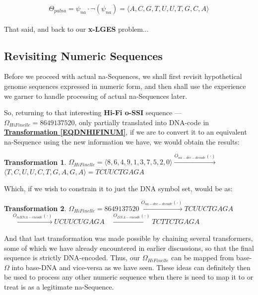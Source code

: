 \documentclass[a4paper, 18pt]{book} %
\newtheorem{trans}{Transformation}
\begin{document}
\begin{equation}
\label{EQPALNASEQ}
\Theta_{palna} = \psi_{na} \cdot \lnot(\psi_{na}) =  \langle A , C , G , T , U , U , T , G , C , A \rangle
\end{equation}\\


That said, and back to our \textbf{x-LGES} problem...

\subsection{Revisiting Numeric Sequences}

Before we proceed with actual na-Sequences, we shall first revisit hypothetical genome sequences expressed in numeric form, and then shall use the experience we garner to handle processing of actual na-Sequences later.

So, returning to that interesting \textbf{Hi-Fi o-SSI} sequence --- $\Omega_{HiFinelle} = 8649137520$, only partially translated into DNA-code in  \textbf{\hyperref[EQDNHIFINUM]{Transformation \ref{EQDNHIFINUM}}}, if we are to convert it to an equivalent na-Sequence using the new information we have, we would obtain the results:

\begin{trans}
\label{EQDNHIFINUMCOMPLETE}
$\Omega_{HiFinelle} = \langle 8,6,4,9,1,3,7,5,2,0 \rangle \xrightarrow{O_{na-dec-decode}(\cdot)}$\\
$  \langle T,C,U,U,C,T,G,A,G,A \rangle = TCUUCTGAGA$\\
\end{trans}


Which, if we wish to constrain it to just the DNA symbol set, would be as:


\begin{trans}
$\Omega_{HiFinelle} = 8649137520 \xrightarrow{O_{na-dec-decode}(\cdot)} TCUUCTGAGA$\\
$ \quad  \xrightarrow{O_{mRNA-encode}(\cdot)} UCUUCUGAGA \quad  \xrightarrow{O_{DNA-encode}(\cdot)} TCTTCTGAGA$
\end{trans}


And that last transformation was made possible by chaining several transformers, some of which we have already encountered in earlier discussions, so that the final sequence is strictly DNA-encoded. Thus, our $\Omega_{HiFinelle}$ can be mapped from base-$\Omega$ into base-DNA and vice-versa as we have seen. These ideas can definitely then be used to process any other numeric sequence when there is need to map it to or treat is as a legitimate na-Sequence.
\end{document}

